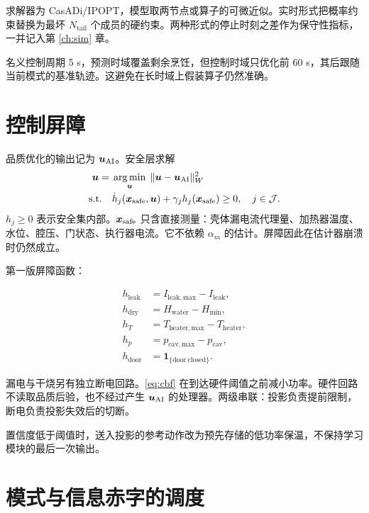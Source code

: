 求解器为 CasADi/IPOPT，模型取两节点或算子的可微近似。实时形式把概率约束替换为最坏 $N_{\mathrm{tail}}$ 个成员的硬约束。两种形式的停止时刻之差作为保守性指标，一并记入第 \ref{ch:sim} 章。

名义控制周期 5 s，预测时域覆盖剩余烹饪，但控制时域只优化前 60 s，其后跟随当前模式的基准轨迹。这避免在长时域上假装算子仍然准确。

\section{控制屏障}

品质优化的输出记为 $\bm{u}_{\mathrm{AI}}$。安全层求解
\begin{equation}
\label{eq:cbf}
\begin{aligned}
\bm{u}={}&\operatorname*{arg\,min}_{\bm{u}}\;\|\bm{u}-\bm{u}_{\mathrm{AI}}\|_W^2\\
\mathrm{s.t.}\quad
&\dot h_j(\bm{x}_{\mathrm{safe}},\bm{u})+\gamma_j h_j(\bm{x}_{\mathrm{safe}})\ge 0,
\quad j\in\mathcal{J}.
\end{aligned}
\end{equation}
$h_j\ge 0$ 表示安全集内部。$\bm{x}_{\mathrm{safe}}$ 只含直接测量：壳体漏电流代理量、加热器温度、水位、腔压、门状态、执行器电流。它不依赖 $\alpha_m$ 的估计。屏障因此在估计器崩溃时仍然成立。

第一版屏障函数：

\begin{align}
h_{\mathrm{leak}}&=I_{\mathrm{leak,max}}-I_{\mathrm{leak}},\\
h_{\mathrm{dry}}&=H_{\mathrm{water}}-H_{\min},\\
h_{T}&=T_{\mathrm{heater,max}}-T_{\mathrm{heater}},\\
h_{p}&=p_{\mathrm{cav,max}}-p_{\mathrm{cav}},\\
h_{\mathrm{door}}&=\mathbf{1}_{\{\mathrm{door\ closed}\}}.
\end{align}

漏电与干烧另有独立断电回路。\eqref{eq:cbf} 在到达硬件阈值之前减小功率。硬件回路不读取品质后验，也不经过产生 $\bm{u}_{\mathrm{AI}}$ 的处理器。两级串联：投影负责提前限制，断电负责投影失效后的切断。

置信度低于阈值时，送入投影的参考动作改为预先存储的低功率保温，不保持学习模块的最后一次输出。

\section{模式与信息赤字的调度}

